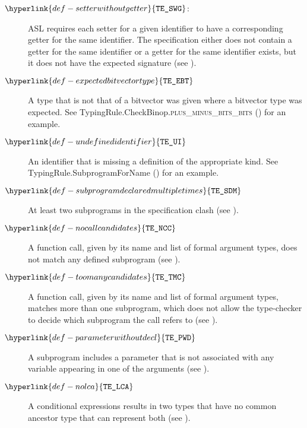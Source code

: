 \documentclass{book}
\newcommand\typingrulecasename[2]{TypingRule.{#1}.\textsc{#2}}
\newcommand\TypeErrorCode[1]{\texttt{TE\_#1}}
\newcommand\UndefinedIdentifier[0]{\hyperlink{def-undefinedidentifier}{\TypeErrorCode{UI}}}
\newcommand\SetterWithoutGetter[0]{\hyperlink{def-setterwithoutgetter}{\TypeErrorCode{SWG}}}
\newcommand\ExpectedBitvectorType[0]{\hyperlink{def-expectedbitvectortype}{\TypeErrorCode{EBT}}}
\newcommand\SubrogramDeclaredMultipleTimes[0]{\hyperlink{def-subprogramdeclaredmultipletimes}{\TypeErrorCode{SDM}}}
\newcommand\NoCallCandidates[0]{\hyperlink{def-nocallcandidates}{\TypeErrorCode{NCC}}}
\newcommand\TooManyCandidates[0]{\hyperlink{def-toomanycandidates}{\TypeErrorCode{TMC}}}
\newcommand\ParameterWithoutDecl[0]{\hyperlink{def-parameterwithoutdecl}{\TypeErrorCode{PWD}}}
\newcommand\NoLCA[0]{\hyperlink{def-nolca}{\TypeErrorCode{LCA}}}
\begin{document}
\begin{description}
\hypertarget{def-setterwithoutgetter}{}
\item[$\SetterWithoutGetter$:]
ASL requires each setter for a given identifier to have a corresponding getter for the same
identifier.
The specification either does not contain a getter for the same identifier
or a getter for the same identifier exists, but it does not have the expected
signature (see ).

\hypertarget{def-expectedbitvectortype}{}
\item[$\ExpectedBitvectorType$]
A type that is not that of a bitvector was given where a bitvector type was expected.
See \typingrulecasename{CheckBinop}{plus\_minus\_bits\_bits} () for an example.

\hypertarget{def-undefinedidentifier}{}
\item[$\UndefinedIdentifier$]
An identifier that is missing a definition of the appropriate kind.
See TypingRule.SubprogramForName () for an example.

\hypertarget{def-subprogramdeclaredmultipletimes}{}
\item[$\SubrogramDeclaredMultipleTimes$]
At least two subprograms in the specification clash (see ).

\hypertarget{def-nocallcandidates}{}
\item[$\NoCallCandidates$]
A function call, given by its name and list of formal argument types, does not match any defined subprogram
(see ).

\hypertarget{def-toomanycandidates}{}
\item[$\TooManyCandidates$]
A function call, given by its name and list of formal argument types, matches more than one subprogram,
which does not allow the type-checker to decide which subprogram the call refers to
(see ).

\hypertarget{def-parameterwithoutdecl}{}
\item[$\ParameterWithoutDecl$]
A subprogram includes a parameter that is not associated with any variable appearing in one of the arguments
(see ).

\hypertarget{def-nolca}{}
\item[$\NoLCA$]
A conditional expressions results in two types that have no common ancestor type that can represent both
(see ).


\end{description}
\end{document}
